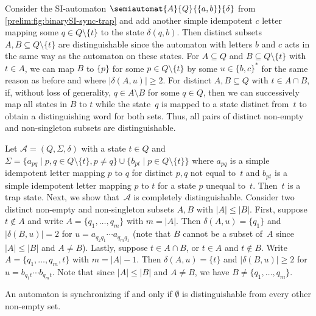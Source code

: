 \begin{example}  \label{sync_max:ex:dist-trap-state-two}
	Consider the SI-automaton $\semiautomat{A}{Q}{\{a,b\}}{\delta}$ from \cref{prelim:fig:binarySI-sync-trap}
	and add another simple idempotent $c$ letter mapping some $q \in Q \setminus \{t\}$
	to the state $\delta(q, b)$.
	Then distinct subsets $A, B \subseteq Q \setminus \{t\}$
	are distinguishable since the automaton with letters $b$ and $c$
	acts in the same way as the \Cerny automaton on these states.
	For $A \subseteq Q$ and $B \subseteq Q \setminus \{t\}$
	with $t \in A$, we can map $B$ to $\{p\}$ for some $p \in Q \setminus \{t\}$
	by some $u \in \{b,c\}^*$ for the same reason as before and where
	$|\delta(A, u)| \ge 2$.
	For distinct $A, B \subseteq Q$ with $t \in A \cap B$,
	if, without loss of generality, $q \in A \setminus B$
	for some $q \in Q$,
	then we can successively map all states in $B$ to $t$
	while the state~$q$ is mapped to a state distinct from~$t$
	to obtain a distinguishing word for both sets.
	Thus, all pairs of distinct non-empty and non-singleton subsets
	are distinguishable.	
\end{example}

\begin{example}
	Let $\mathcal A = (Q, \Sigma, \delta)$ with a state $t \in Q$
	and $\Sigma = \{ a_{pq} \mid p,q \in Q \setminus \{t\}, p \ne q\} \cup
	\{ b_{pt} \mid p \in Q \setminus \{t\}\}$
	where $a_{pq}$ is a simple idempotent letter mapping $p$
	to $q$ for distinct $p,q$ not equal to~$t$
	and $b_{pt}$ is a simple idempotent letter mapping $p$ to $t$
	for a state $p$ unequal to~$t$.
	Then~$t$ is a trap state. 
	Next, we show that~$\mathcal A$ is completely distinguishable.
	Consider two distinct non-empty and non-singleton
	subsets $A, B$  with $|A| \le |B|$. 
	First, suppose $t \notin A$
	and write $A = \{q_1, \ldots, q_m\}$ with $m = |A|$.
	Then $\delta(A, u) = \{q_1\}$
	and $|\delta(B, u)| = 2$ 
	for $u = a_{q_2 q_1} \cdots a_{q_m q_1}$
	(note that $B$ cannot be a subset of~$A$
	since $|A| \le |B|$ and $A \ne B$).
	Lastly, suppose $t \in A \cap B$, or $t \in A$ and $t \notin B$.
	Write $A = \{q_1, \ldots, q_m, t \}$ with $m = |A| - 1$.
	Then $\delta(A, u) = \{t\}$ and $|\delta(B, u)| \ge 2$ for $u = b_{q_1t} \cdots b_{q_mt}$. Note that since $|A| \le |B|$ and $A \ne B$,
	we have $B \ne \{q_1, \ldots, q_m\}$.	
\end{example}

\begin{example} An automaton is synchronizing if and only if $\emptyset$
	is distinguishable from every other non-empty set.
\end{example}


